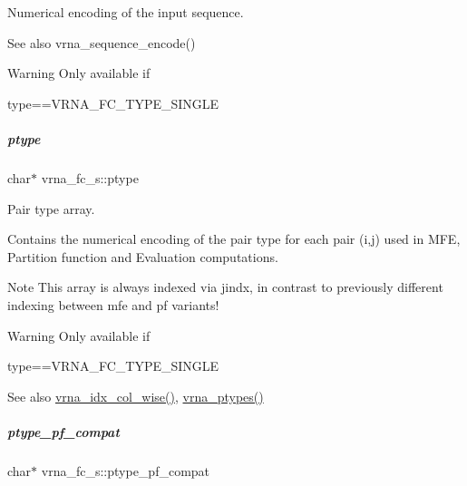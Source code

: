 Numerical encoding of the input sequence. 

\begin{DoxySeeAlso}{See also}
vrna\+\_\+sequence\+\_\+encode() 
\end{DoxySeeAlso}
\begin{DoxyWarning}{Warning}
Only available if\begin{DoxyVerb}type==VRNA_FC_TYPE_SINGLE \end{DoxyVerb}
 
\end{DoxyWarning}
\mbox{\label{group__fold__compound_a3fbea559f1d1976b2d67c215cdeee0b2}} 
\subparagraph{\texorpdfstring{ptype}{ptype}}
{\footnotesize\ttfamily char$\ast$ vrna\+\_\+fc\+\_\+s\+::ptype}



Pair type array. 

Contains the numerical encoding of the pair type for each pair (i,j) used in M\+FE, Partition function and Evaluation computations. \begin{DoxyNote}{Note}
This array is always indexed via jindx, in contrast to previously different indexing between mfe and pf variants! 
\end{DoxyNote}
\begin{DoxyWarning}{Warning}
Only available if\begin{DoxyVerb}type==VRNA_FC_TYPE_SINGLE \end{DoxyVerb}
 
\end{DoxyWarning}
\begin{DoxySeeAlso}{See also}
\hyperlink{group__utils_ga89ebc69c52fa0c78c9e1974b0017746b}{vrna\+\_\+idx\+\_\+col\+\_\+wise()}, \hyperlink{group__alphabet__utils_ga51a9e86a5f731f5f2f5584ee67cee4a8}{vrna\+\_\+ptypes()} 
\end{DoxySeeAlso}
\mbox{\label{group__fold__compound_a7fe1235ce3d41287695f1ae1e283e8fc}} 
\subparagraph{\texorpdfstring{ptype\+\_\+pf\+\_\+compat}{ptype\_pf\_compat}}
{\footnotesize\ttfamily char$\ast$ vrna\+\_\+fc\+\_\+s\+::ptype\+\_\+pf\+\_\+compat}



